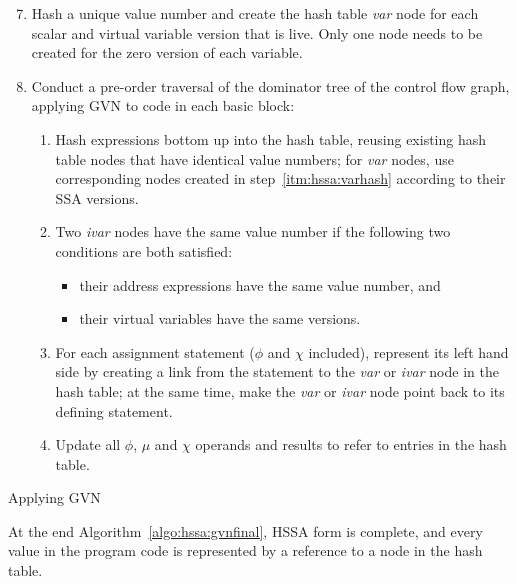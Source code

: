 \begin{algorithm}[H]
\begin{enumerate}
\setcounter{enumi}{6}
\item\label{itm:hssa:varhash} Hash a unique value number and create the hash
table {\em var} node for each scalar and virtual variable version that is live. 
Only one node needs to be created for the zero version of each variable.
\item Conduct a pre-order traversal of the dominator tree of the control flow graph, applying GVN to code in each basic block:
  \begin{enumerate}
    \item Hash expressions bottom up into the hash table, reusing existing hash table nodes that have identical value numbers; for {\em var} nodes, use 
    corresponding nodes created in step~\ref{itm:hssa:varhash} according to 
    their SSA versions.
    \item Two {\em ivar} nodes have the same value number if the following two conditions are both satisfied:
      \begin{itemize}
        \item their address expressions have the same value number, and
        \item their virtual variables have the same versions.
      \end{itemize}
    \item For each assignment statement ($\phi$ and $\chi$ included), represent
    its left hand side by creating a link from the statement to the {\em var} or
    {\em ivar} node in the hash table; at the same time, make the {\em var} or
    {\em ivar} node point back to its defining statement.
    \item Update all $\phi$, $\mu$ and $\chi$ operands and results to refer to
    entries in the hash table.
  \end{enumerate}
\end{enumerate}
\caption{\label{algo:hssa:gvnfinal}Applying GVN}
\end{algorithm}

At the end Algorithm~\ref{algo:hssa:gvnfinal}, HSSA form is complete, and every value in the program code is represented by a reference to a node in the hash table.

